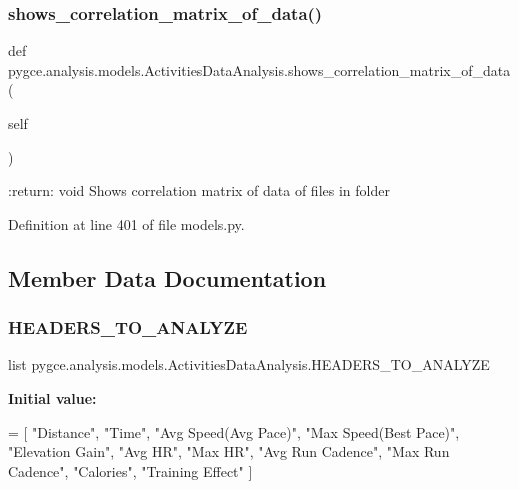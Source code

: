 \subsubsection{\texorpdfstring{shows\+\_\+correlation\+\_\+matrix\+\_\+of\+\_\+data()}{shows\_correlation\_matrix\_of\_data()}}
{\footnotesize\ttfamily def pygce.\+analysis.\+models.\+Activities\+Data\+Analysis.\+shows\+\_\+correlation\+\_\+matrix\+\_\+of\+\_\+data (\begin{DoxyParamCaption}\item[{}]{self }\end{DoxyParamCaption})}

\begin{DoxyVerb}:return: void
    Shows correlation matrix of data of files in folder
\end{DoxyVerb}
 

Definition at line 401 of file models.\+py.



\subsection{Member Data Documentation}
\mbox{\label{classpygce_1_1analysis_1_1models_1_1_activities_data_analysis_a799ad90125cc686b985fe525a3b33062}} 
\subsubsection{\texorpdfstring{H\+E\+A\+D\+E\+R\+S\+\_\+\+T\+O\+\_\+\+A\+N\+A\+L\+Y\+ZE}{HEADERS\_TO\_ANALYZE}}
{\footnotesize\ttfamily list pygce.\+analysis.\+models.\+Activities\+Data\+Analysis.\+H\+E\+A\+D\+E\+R\+S\+\_\+\+T\+O\+\_\+\+A\+N\+A\+L\+Y\+ZE\hspace{0.3cm}{\ttfamily [static]}}

{\bfseries Initial value\+:}
\begin{DoxyCode}
=  [
        \textcolor{stringliteral}{"Distance"},
        \textcolor{stringliteral}{"Time"},
        \textcolor{stringliteral}{"Avg Speed(Avg Pace)"},
        \textcolor{stringliteral}{"Max Speed(Best Pace)"},
        \textcolor{stringliteral}{"Elevation Gain"},
        \textcolor{stringliteral}{"Avg HR"},
        \textcolor{stringliteral}{"Max HR"},
        \textcolor{stringliteral}{"Avg Run Cadence"},
        \textcolor{stringliteral}{"Max Run Cadence"},
        \textcolor{stringliteral}{"Calories"},
        \textcolor{stringliteral}{"Training Effect"}
    ]
\end{DoxyCode}


